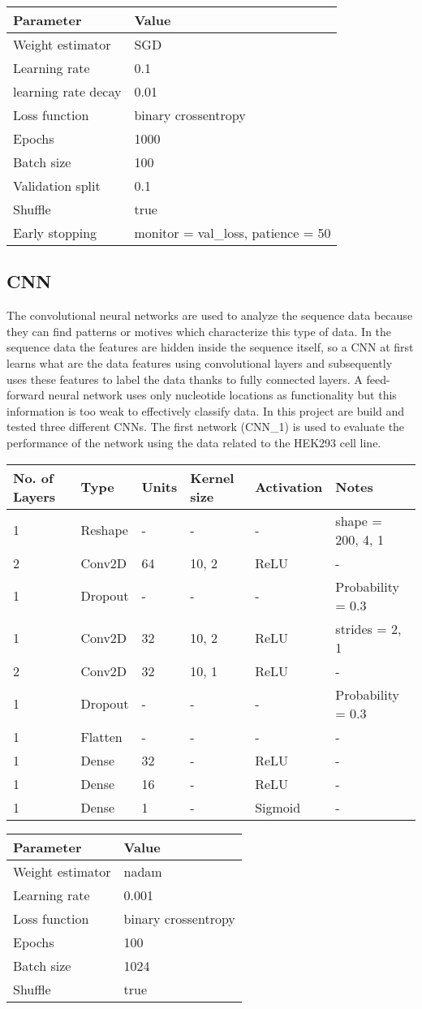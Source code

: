 \newpage
\begin{longtable}[]{@{}ll@{}}
\toprule
\textbf{Parameter} & \textbf{Value}\tabularnewline
\midrule
\endhead
Weight estimator & SGD\tabularnewline
Learning rate & 0.1\tabularnewline
learning rate decay & 0.01\tabularnewline
Loss function & binary crossentropy\tabularnewline
Epochs & 1000\tabularnewline
Batch size & 100\tabularnewline
Validation split & 0.1\tabularnewline
Shuffle & true\tabularnewline
Early stopping & monitor = val\_loss, patience = 50\tabularnewline
\bottomrule
\end{longtable}

\subsection{CNN}\label{header-n371}

The convolutional neural networks are used to analyze the sequence data
because they can find patterns or motives which characterize this type
of data. In the sequence data the features are hidden inside the
sequence itself, so a CNN at first learns what are the data features
using convolutional layers and subsequently uses these features to label
the data thanks to fully connected layers. A feed-forward neural network
uses only nucleotide locations as functionality but this information is
too weak to effectively classify data. In this project are build and
tested three different CNNs. The first network (CNN\_1) is used to
evaluate the performance of the network using the data related to the
HEK293 cell line.

\begin{longtable}[]{@{}llllll@{}}
\toprule
\textbf{No. of Layers} & \textbf{Type} & \textbf{Units} & \textbf{Kernel size} & \textbf{Activation} &
\textbf{Notes}\tabularnewline
\midrule
\endhead
1 & Reshape & - & - & - & shape = 200, 4, 1\tabularnewline
2 & Conv2D & 64 & 10, 2 & ReLU & -\tabularnewline
1 & Dropout & - & - & - & Probability = 0.3\tabularnewline
1 & Conv2D & 32 & 10, 2 & ReLU & strides = 2, 1\tabularnewline
2 & Conv2D & 32 & 10, 1 & ReLU & -\tabularnewline
1 & Dropout & - & - & - & Probability = 0.3\tabularnewline
1 & Flatten & - & - & - & -\tabularnewline
1 & Dense & 32 & - & ReLU & -\tabularnewline
1 & Dense & 16 & - & ReLU & -\tabularnewline
1 & Dense & 1 & - & Sigmoid & -\tabularnewline
\bottomrule
\end{longtable}

\begin{longtable}[]{@{}ll@{}}
\toprule
\textbf{Parameter} & \textbf{Value}\tabularnewline
\midrule
\endhead
Weight estimator & nadam\tabularnewline
Learning rate & 0.001\tabularnewline
Loss function & binary crossentropy\tabularnewline
Epochs & 100\tabularnewline
Batch size & 1024\tabularnewline
Shuffle & true\tabularnewline
\bottomrule
\end{longtable}

